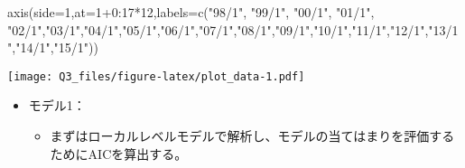 \documentclass[]{article}
\newenvironment{Shaded}{\begin{snugshade}}{\end{snugshade}}
\newcommand{\AttributeTok}[1]{\textcolor[rgb]{0.77,0.63,0.00}{#1}}
\newcommand{\DecValTok}[1]{\textcolor[rgb]{0.00,0.00,0.81}{#1}}
\newcommand{\FunctionTok}[1]{\textcolor[rgb]{0.00,0.00,0.00}{#1}}
\newcommand{\NormalTok}[1]{#1}
\newcommand{\SpecialCharTok}[1]{\textcolor[rgb]{0.00,0.00,0.00}{#1}}
\newcommand{\StringTok}[1]{\textcolor[rgb]{0.31,0.60,0.02}{#1}}
\providecommand{\tightlist}{%
  \setlength{\itemsep}{0pt}\setlength{\parskip}{0pt}}
\begin{document}
\begin{Shaded}
\begin{Highlighting}[]
\FunctionTok{axis}\NormalTok{(}\AttributeTok{side=}\DecValTok{1}\NormalTok{,}\AttributeTok{at=}\DecValTok{1}\SpecialCharTok{+}\DecValTok{0}\SpecialCharTok{:}\DecValTok{17}\SpecialCharTok{*}\DecValTok{12}\NormalTok{,}\AttributeTok{labels=}\FunctionTok{c}\NormalTok{(}\StringTok{"98/1"}\NormalTok{, }\StringTok{"99/1"}\NormalTok{, }\StringTok{"00/1"}\NormalTok{, }\StringTok{"01/1"}\NormalTok{, }\StringTok{"02/1"}\NormalTok{,}\StringTok{"03/1"}\NormalTok{,}\StringTok{"04/1"}\NormalTok{,}\StringTok{"05/1"}\NormalTok{,}\StringTok{"06/1"}\NormalTok{,}\StringTok{"07/1"}\NormalTok{,}\StringTok{"08/1"}\NormalTok{,}\StringTok{"09/1"}\NormalTok{,}\StringTok{"10/1"}\NormalTok{,}\StringTok{"11/1"}\NormalTok{,}\StringTok{"12/1"}\NormalTok{,}\StringTok{"13/1"}\NormalTok{,}\StringTok{"14/1"}\NormalTok{,}\StringTok{"15/1"}\NormalTok{))}
\end{Highlighting}
\end{Shaded}

\texttt{[image: Q3\_files/figure-latex/plot\_data-1.pdf]}

\begin{itemize}
\tightlist
\item
  モデル1：

  \begin{itemize}
  \tightlist
  \item
    まずはローカルレベルモデルで解析し、モデルの当てはまりを評価するためにAICを算出する。
  \end{itemize}
\end{itemize}
\end{document}
